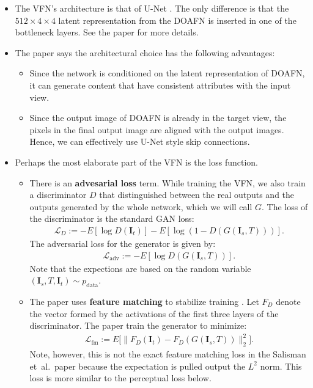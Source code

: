 \documentclass[10pt]{article}
\newcommand{\ve}[1]{\pmb{#1}}
\newcommand{\mc}[1]{\mathcal{#1}}
\newcommand{\mrm}[1]{\mathrm{#1}}
\newcommand{\etal}{{et~al.}}
\begin{document}
  \begin{itemize}
  	\item The VFN's architecture is that of U-Net \cite{Ronneberger:2015}. The only difference is that the $512 \times 4 \times 4$ latent representation from the DOAFN is inserted in one of the bottleneck layers. See the paper for more details. 

  	\item The paper says the architectural choice has the following advantages:
  	\begin{itemize}
  		\item Since the network is conditioned on the latent representation of DOAFN, it can generate content that have consistent attributes with the input view.

  		\item Since the output image of DOAFN is already in the target view, the pixels in the final output image are aligned with the output images. Hence, we can effectively use U-Net style skip connections.
  	\end{itemize}

  	\item Perhaps the most elaborate part of the VFN is the loss function.
  	\begin{itemize}
  		\item There is an \textbf{advesarial loss} term. While training the VFN, we also train a discriminator $D$ that distinguished between the real outputs and the outputs generated by the whole network, which we will call $G$. The loss of the discriminator is the standard GAN loss:
  		\begin{align*}
  			\mc{L}_D := 
  			-E [\log D(\ve{I}_t)] 
  			-E [\log (1 - D(G(\ve{I}_s, T)))].
  		\end{align*}  		
  		The adversarial loss for the generator is given by:
  		\begin{align*}
  			\mc{L}_{\mrm{adv}} := -E [\log D(G(\ve{I}_s, T))].
  		\end{align*}
  		Note that the expections are based on the random variable ${(\ve{I}_s, T, \ve{I}_t) \sim p_{\mrm{data}}}$.

  		\item The paper uses \textbf{feature matching} to stabilize training \cite{Salisman:2016}. Let $F_D$ denote the vector formed by the activations of the first three layers of the discriminator. The paper train the generator to minimize:
  		\begin{align*}
  		 	\mc{L}_{\mrm{fm}} := E \Big[ \| F_D(\ve{I}_t) - F_D(G(\ve{I}_s, T)) \|_2^2 \Big].
  		\end{align*} 
  		Note, however, this is not the exact feature matching loss in the Salisman \etal~paper because the expectation is pulled output the $L^2$ norm. This loss is more similar to the perceptual loss below.


\end{itemize}
\end{itemize}
\end{document}
